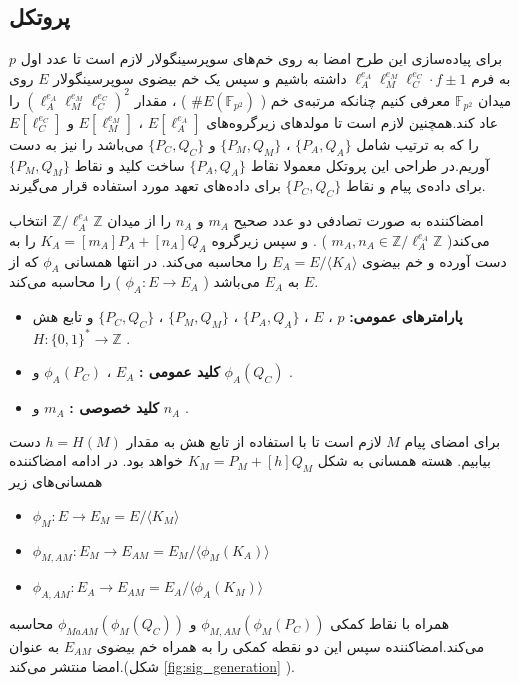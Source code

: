 \documentclass[12pt,a4paper]{article}
\theoremstyle{plain}
\theoremstyle{definition}
\theoremstyle{remark}
\begin{document}
\subsection{پروتکل}

برای پیاده‌سازی این طرح امضا به روی خم‌های سوپرسینگولار لازم است تا عدد اول 
$p$
 به فرم 
 $\ell_A^{e_A} \ell_M^{e_M} \ell_C^{e_C} \cdot f \pm 1$
داشته باشیم و سپس یک خم بیضوی سوپرسینگولار 
$E$
روی میدان
$\mathbb{F}_{p^2}$
معرفی کنیم چنانکه مرتبه‌ی خم (
$\# E(\mathbb{F}_{p^2})$
)
، مقدار
$(\ell_A^{e_A} \ell_M^{e_M} \ell_C^{e_C})^2$
را عاد کند.همچنین لازم است تا مولدهای زیرگروه‌های 
$E[\ell_A^{e_A}]$
،
$E[\ell_M^{e_M}]$
و
$E[\ell_C^{e_C}]$
را که به ترتیب شامل
$\{ P_A,Q_A\}$
،
$\{P_M,Q_M\}$
و
$\{P_C,Q_C\}$
می‌باشد را نیز به دست آوریم.در طراحی این پروتکل معمولا نقاط
$\{ P_A,Q_A\}$
ساخت کلید و نقاط
$\{P_M,Q_M\}$
برای داده‌ی پیام و نقاط
$\{P_C,Q_C\}$
برای داده‌های تعهد مورد استفاده قرار می‌گیرند.

امضاکننده به صورت تصادفی دو عدد صحیح
$m_A$
و
$n_A$
را از میدان
$\mathbb{Z} / \ell_A^{e_A} \mathbb{Z}$
انتخاب می‌کند(
$m_A,n_A \in \mathbb{Z} / \ell_A^{e_A} \mathbb{Z}$
)
. و سپس زیرگروه
$K_A = [m_A]P_A + [n_A]Q_A$
را به دست آورده و خم بیضوی
$E_A = E/ \langle K_A \rangle$
را محاسبه می‌کند. در انتها همسانی
$\phi_A$
که از
$E$
به
$E_A$
می‌باشد (
$ \phi_A : E \rightarrow E_A $
) را محاسبه می‌کند.
\begin{itemize}
	\item[]{\bf پارامترهای عمومی:}
	$p$
	،
	$E$
	،
	$\{ P_A,Q_A\}$
	،
	$\{P_M,Q_M\}$
	،
	$\{P_C,Q_C\}$
	و  تابع هش 
	$H : \{0,1\}^* \rightarrow \mathbb{Z}$
	.
	\item[]{\bf کلید عمومی :  }
	$E_A$
	،
	$\phi_A(P_C)$
	و
	$\phi_A(Q_C)$
	.
	\item[]{\bf کلید خصوصی :   }
	$m_A$
	و
	$n_A$
	.
\end{itemize}

برای امضای پیام
$M$
لازم است تا با استفاده از تابع هش به مقدار
$h = H(M)$
دست بیابیم. هسته همسانی به شکل
$K_M  = P_M + [h]Q_M$
خواهد بود. در ادامه امضاکننده همسانی‌های زیر 

\begin{itemize}
	
	\item 
	$\phi_M : E \rightarrow E_M = E / \langle K_M \rangle $
	
	\item 
	$\phi_{M,AM} : E_M \rightarrow E_{AM} = E_M / \langle \phi_{M}(K_A) \rangle$
	
	\item 
	$\phi_{A,AM} : E_A \rightarrow E_{AM} = E_A / \langle \phi_A(K_M) \rangle $
\end{itemize}
همراه با نقاط کمکی 
$\phi_{M,AM}(\phi_M(P_C))$
و
$\phi_{MaAM}(\phi_M(Q_C))$
محاسبه می‌کند.امضاکننده سپس این دو نقطه کمکی را به همراه خم بیضوی
$E_{AM}$
به عنوان امضا منتشر می‌کند.(شکل 
\ref{fig:sig_generation}
).
\end{document}
